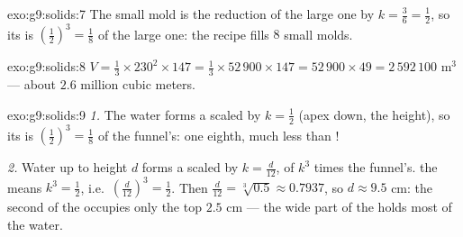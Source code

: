 \begin{solution}{exo:g9:solids:7}
The small mold is the reduction of the large one by $k = \frac36 =
\frac12$, so its  is $\left(\frac12\right)^3 = \frac18$ of the
large one: the recipe fills $8$ small molds.
\end{solution}

\begin{solution}{exo:g9:solids:8}
$V = \frac13 \times 230^2 \times 147 = \frac13 \times 52\,900 \times 147
= 52\,900 \times 49 = 2\,592\,100$ m$^3$ --- about $2.6$ million cubic
meters.
\end{solution}

\begin{solution}{exo:g9:solids:9}
\emph{1.} The water forms a  scaled by $k = \frac12$ (apex down,
 the height), so its  is $\left(\frac12\right)^3 = \frac18$
of the funnel's: one eighth, much less than !

\emph{2.} Water up to height $d$ forms a  scaled by
$k = \frac{d}{12}$, of  $k^3$ times the funnel's.  the 
means $k^3 = \frac12$, i.e.\
$\left(\frac{d}{12}\right)^3 = \frac12$. Then
$\frac{d}{12} = \sqrt[3]{0.5} \approx 0.7937$, so
$d \approx 9.5$ cm: the second  of the  occupies only the top
$2.5$ cm --- the wide part of the \omterm{def:g8:solids:def}{cone} holds most of the water.
\end{solution}

